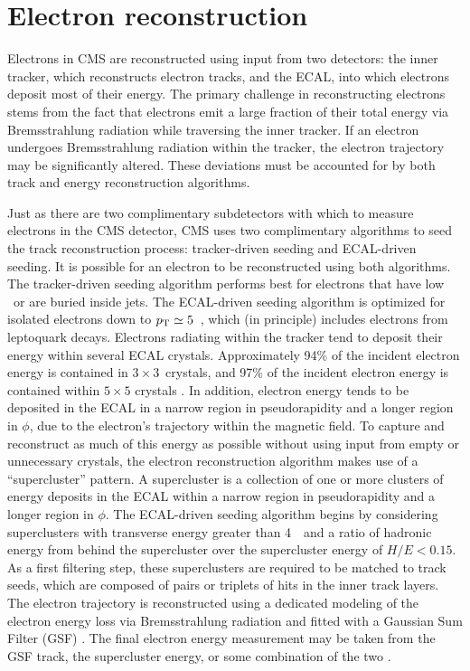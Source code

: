 \section{Electron reconstruction}
\label{sec:reco-electron}

Electrons in CMS are reconstructed using input from two detectors:
the inner tracker, which reconstructs electron tracks, and the ECAL,
into which electrons deposit most of their energy.
The primary challenge in reconstructing electrons stems from the fact
that electrons emit a large fraction of their total energy via 
Bremsstrahlung radiation while traversing the inner tracker.  
If an electron undergoes Bremsstrahlung radiation within the tracker,
the electron trajectory may be significantly altered.  These deviations
must be accounted for by both track and energy reconstruction algorithms.

Just as there are two complimentary subdetectors with which to measure electrons
in the CMS detector, CMS uses two complimentary algorithms to seed the 
track reconstruction process: tracker-driven seeding and ECAL-driven 
seeding.  It is possible for an electron to be reconstructed using both algorithms.
The tracker-driven seeding algorithm performs best for electrons that have 
low \pt~or are buried inside jets.
The ECAL-driven seeding algorithm is optimized for isolated electrons down to 
$p_{\text{T}} \simeq 5$~\GeV, which (in principle) includes electrons from leptoquark decays.
Electrons radiating within the tracker tend to deposit their energy within 
several ECAL crystals.  Approximately 94\% of the incident electron energy
is contained in $3\times3$~crystals, and 97\% of the incident electron
energy is contained within $5\times5$ crystals \cite{cms-tdr}.  In addition,
electron energy tends to be deposited in the ECAL in a narrow region in 
pseudorapidity and a longer region in $\phi$, due to the electron's trajectory 
within the magnetic field.  To capture and reconstruct as much of this energy 
as possible without using input from empty or unnecessary crystals, 
the electron reconstruction algorithm makes use of a ``supercluster'' pattern.
A supercluster is a collection of one or more clusters of energy deposits in 
the ECAL within a narrow region in pseudorapidity and a longer region in $\phi$.
The ECAL-driven seeding algorithm begins by considering superclusters with transverse energy
greater than 4~\GeV~and a ratio of hadronic energy from behind the supercluster
over the supercluster energy of $H/E < 0.15$.  
As a first filtering step, these superclusters are required to be matched to
track seeds, which are composed of pairs or triplets of hits in the inner
track layers.  The electron trajectory is reconstructed using a dedicated
modeling of the electron energy loss via Bremsstrahlung radiation
and fitted with a Gaussian Sum Filter (GSF)
 \cite{gsf}.
The final electron energy measurement may be taken from the GSF track,
the supercluster energy, or some combination of the two
\cite{electron-1,electron-2,electron-3}.

